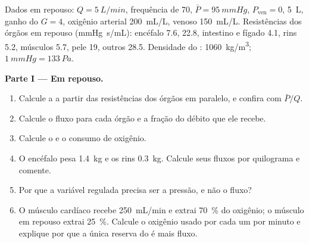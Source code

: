 \begin{problem}
\label{pb:b2:blood-pressure:1}
Dados em repouso: $Q = \qty{5}{L/min}$, frequência de 70,
$\bar P = \qty{95}{mmHg}$, $P_{\text{ven}} = 0$,  \qty{5}{L},
ganho do  $G = 4$, oxigênio arterial \qty{200}{mL/L},
venoso \qty{150}{mL/L}. Resistências dos órgãos em repouso
(\unit{mmHg.s/mL}): encéfalo 7.6,  22.8, intestino e fígado 4.1,
rins 5.2, músculos 5.7, pele 19, outros 28.5. Densidade do :
\qty{1060}{kg/m^3}; $\qty{1}{mmHg} = \qty{133}{Pa}$.

\medskip
\noindent\textbf{Parte I --- Em repouso.}
\begin{enumerate}
  \item Calcule a  a partir das resistências
        dos órgãos em paralelo, e confira com $\bar P/Q$.
  \item Calcule o fluxo para cada órgão e a fração do débito que ele
        recebe.
  \item Calcule o  e o consumo de oxigênio.
  \item O encéfalo pesa \qty{1.4}{kg} e os rins \qty{0.3}{kg}. Calcule
        seus fluxos por quilograma e comente.
  \item Por que a variável regulada precisa ser a pressão, e não o
        fluxo?
  \item O músculo cardíaco recebe \qty{250}{mL/min} e extrai
        \qty{70}{\%} do oxigênio; o músculo em repouso extrai
        \qty{25}{\%}. Calcule o oxigênio usado por cada um por minuto e
        explique por que a única reserva do  é mais fluxo.
\end{enumerate}


\end{problem}
